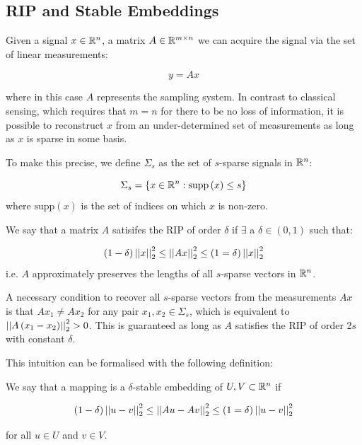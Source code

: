 \documentclass{article}
\begin{document}
\subsection{RIP and Stable Embeddings}
Given a signal \(x \in {\mathbb{R}}^n\), a matrix \(A \in {\mathbb{R}}^{m \times n}\) we can acquire the signal via the set of linear measurements:

\begin{equation}
y = Ax
\end{equation}

where in this case \(A\) represents the sampling system. In contrast to classical sensing, which requires that \(m = n\) for there to be no loss of information, it is possible to reconstruct \(x\) from an under-determined set of measurements as long as \(x\) is sparse in some basis. 

To make this precise, we define \(\Sigma_s\) as the set of \(s\)-sparse signals in \({\mathbb{R}}^n\):

\begin{definition}
\begin{equation}
\Sigma_s = \{ x \in {\mathbb{R}}^n : \mathrm{supp}\left(x\right) \leq s\}
\end{equation}
where \(\mathrm{supp}\left(x\right) \) is the set of indices on which \(x\) is non-zero.
\end{definition}

\begin{definition}[RIP]
We say that a matrix \(A\) satisifes the RIP of order \(\delta\) if \(\exists\) a \(\delta \in \left(0, 1\right)\) such that:

\begin{equation}
\left(1 - \delta\right) \left|\left|x\right|\right|_2^2 \leq \left|\left|Ax\right|\right|_2^2 \leq \left(1 = \delta\right) \left|\left|x\right|\right|_2^2
\end{equation}
i.e. \(A\) approximately preserves the lengths of all \(s\)-sparse vectors in \({\mathbb{R}}^n\). 
\end{definition}

A necessary condition to recover all \(s\)-sparse vectors from the measurements \(Ax\) is that \(Ax_1 \neq Ax_2\) for any pair \(x_1, x_2 \in \Sigma_s\), which is equivalent to \(\left|\left|A\left(x_1 - x_2\right)\right|\right|_2^2 > 0\). This is guaranteed as long as \(A\) satisfies the RIP of order 2\(s\) with constant \(\delta\).

This intuition can be formalised with the following definition:

\begin{definition}
We say that a mapping is a \(\delta\)-stable embedding of \(U,V \subset {\mathbb{R}}^n\) if

\begin{equation}
\left(1 - \delta \right) \left|\left|u-v\right|\right|_2^2 \leq \left|\left|Au-Av\right|\right|_2^2 \leq \left(1 = \delta\right) \left|\left|u-v\right|\right|_2^2
\end{equation}

for all \(u \in U\) and \(v \in V\). 
\label{d-stable}
\end{definition} 
\end{document}
